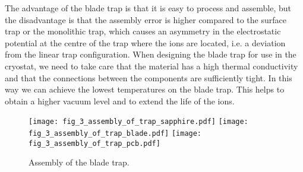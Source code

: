 The advantage of the blade trap is that it is easy to process and assemble, but the disadvantage is that the assembly error is higher compared to the surface trap or the monolithic trap, which causes an asymmetry in the electrostatic potential at the centre of the trap where the ions are located, i.e. a deviation from the linear trap configuration. When designing the blade trap for use in the cryostat, we need to take care that the material has a high thermal conductivity and that the connections between the components are sufficiently tight. In this way we can achieve the lowest temperatures on the blade trap. This helps to obtain a higher vacuum level and to extend the life of the ions.

\begin{figure}
    \centering
    {\texttt{[image: fig\_3\_assembly\_of\_trap\_sapphire.pdf]}}
    {\texttt{[image: fig\_3\_assembly\_of\_trap\_blade.pdf]}}
    {\texttt{[image: fig\_3\_assembly\_of\_trap\_pcb.pdf]}}
    \caption{Assembly of the blade trap.}
\end{figure}

